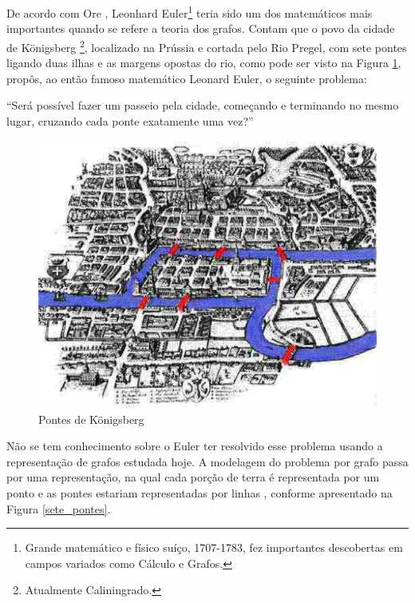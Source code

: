 De acordo com Ore \cite{Ore:1963}, Leonhard Euler\footnote{Grande matemático e físico suíço, 1707-1783, fez importantes descobertas em campos variados como Cálculo e Grafos.} teria sido um dos matemáticos mais importantes quando se refere a teoria dos grafos. Contam que o povo da cidade de Königsberg \footnote{Atualmente Caliningrado.}, localizado na Prússia e cortada pelo Rio Pregel, com sete pontes ligando duas ilhas e as margens opostas do rio, como pode ser visto na Figura \ref{Konigsberg}, propôs, ao então famoso matemático Leonard Euler, o seguinte problema:

	``Será possível fazer um passeio pela cidade, começando e
	terminando no mesmo lugar, cruzando cada ponte exatamente uma vez?''\cite{Ore:1963}

\begin{figure}[!h]
	\centering
	\includegraphics[scale=0.35]{figuras/referencial_teorico/Konigsberg.eps}
	\caption[Pontes de Königsberg]{Pontes de Königsberg\footnotemark}
	\label{Konigsberg}
\end{figure}

Não se tem conhecimento sobre o Euler ter resolvido esse problema usando a representação de grafos estudada hoje. A modelagem do problema por grafo passa por uma representação, na qual cada porção de terra  é representada por um ponto e as pontes estariam representadas por linhas \cite{Ore:1963}, conforme apresentado na Figura \ref{sete_pontes}.


